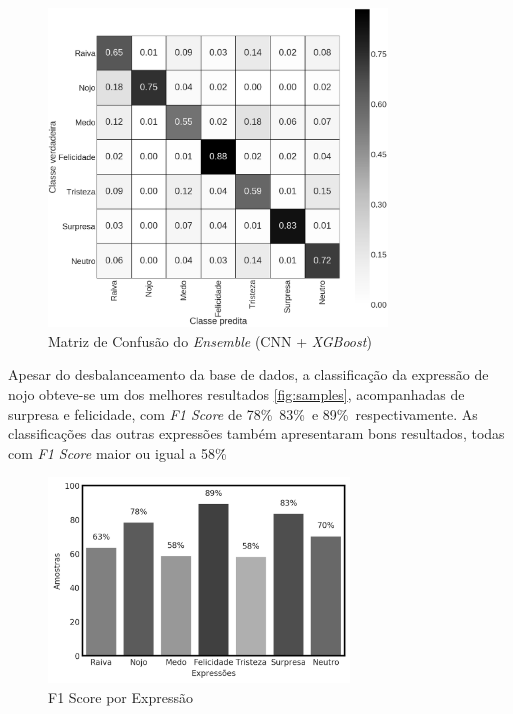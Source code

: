 \begin{figure}[!htb]
    \centering
    \includegraphics[width=9cm]{images/cm_emsemble.png}
    \caption{Matriz de Confusão do \emph{Ensemble} (CNN + \emph{XGBoost})}
    \label{fig:emsemble}
\end{figure}

Apesar do desbalanceamento da base de dados, a classificação da expressão de nojo obteve-se um dos melhores resultados \ref{fig:samples}, acompanhadas de surpresa e felicidade, com \textit{F1 Score} de
78\%\, 83\%\ e 89\%\ respectivamente. As classificações das outras expressões também apresentaram bons resultados, todas com \textit{F1 Score} maior ou igual a 58\%\.

\begin{figure}[!htb]
    \centering
    \includegraphics[width=8cm]{images/f1_bar.png}
    \caption{F1 Score por Expressão}
    \label{fig:f1_bar}
\end{figure}
